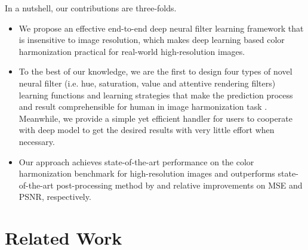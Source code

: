 \documentclass[runningheads]{llncs}
\begin{document}
    In a nutshell, our contributions are three-folds.
    \begin{itemize}[noitemsep,topsep=0pt]
\item
        We propose an effective end-to-end deep neural filter learning framework that is insensitive to image resolution, which makes deep learning based color harmonization practical for real-world high-resolution images.
        
        \item
        To the best of our knowledge,  we are the first to design four types of novel neural filter (i.e. hue, saturation, value and attentive rendering filters) learning functions and learning strategies that make the prediction process and result comprehensible for human in image harmonization task .
        Meanwhile, we provide a simple yet efficient handler for users to cooperate with deep model to get the desired results with very little effort when necessary.
        
        \item Our approach achieves state-of-the-art performance on the color harmonization benchmark for high-resolution images and outperforms state-of-the-art post-processing method by  and  relative improvements on MSE and PSNR, respectively.
    \end{itemize}
    
    




    \section{Related Work}
    
\end{document}
